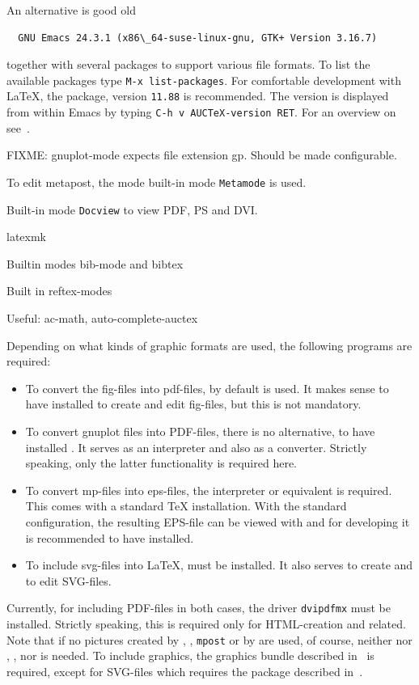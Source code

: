 An alternative is good old 
%
\begin{verbatim}
  GNU Emacs 24.3.1 (x86\_64-suse-linux-gnu, GTK+ Version 3.16.7)
\end{verbatim}
%
together with several packages to support 
various file formats. 
To list the available packages type 
\texttt{M-x list-packages}. 
For comfortable development with \LaTeX, 
the \auctex{} package, version \texttt{11.88} is recommended. 
The version is displayed from within Emacs 
by typing \texttt{C-h v AUCTeX-version RET}. 
For an overview on \auctex{} see~\cite{AucTeX}. 


FIXME\@: gnuplot-mode expects file extension gp. 
Should be made configurable. 

To edit metapost, the mode built-in mode \texttt{Metamode} is used. 

Built-in mode \texttt{Docview} to view PDF, PS and DVI\@. 

latexmk

Builtin modes bib-mode and bibtex

Built in reftex-modes

Useful: 
ac-math, auto-complete-auctex

Depending on what kinds of graphic formats are used, 
the following programs are required: 
%
\begin{itemize}
\item
To convert the \gls{fig}-files into \gls{pdf}-files, 
by default  is used. 
It makes sense to have  installed 
to create and edit fig-files, but this is not mandatory. 
\item
To convert gnuplot files into PDF-files, there is no alternative, 
to have installed . 
It serves as an interpreter and also as a converter. 
Strictly speaking, only the latter functionality is required here. 
\item
To convert \gls{mp}-files into \gls{eps}-files, 
the interpreter  or equivalent is required. 
This comes with a standard \TeX{} installation. 
With the standard configuration, 
the resulting EPS-file can be viewed with  
and for developing it is recommended to have  installed. 
\item
To include \gls{svg}-files into \LaTeX{}, 
 must be installed. 
It also serves to create and to edit SVG-files. 
\end{itemize}


Currently, for including PDF-files in both cases, 
the driver \texttt{dvipdfmx} must be installed. 
Strictly speaking, this is required only for HTML-creation and related. 
Note that if no pictures created by , , 
\texttt{mpost} or by  are used, of course, 
neither  nor ,
,  
nor  is needed. 
To include graphics, the graphics bundle described in~\cite{GraX} is required, 
except for SVG-files which requires the package  
described in~\cite{SvgP}. 

